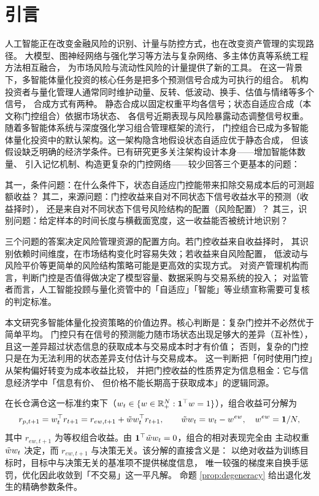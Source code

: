\section{引言}

人工智能正在改变金融风险的识别、计量与防控方式，也在改变资产管理的实现路径。
大模型、图神经网络与强化学习等方法与复杂网络、多主体仿真等系统工程方法相互融合，
为市场风险与流动性风险的计量提供了新的工具\cite{hong2021,suzhi2017,wangfang2020}。
在这一背景下，多智能体量化投资的核心任务是把多个预测信号合成为可执行的组合。
机构投资者与量化管理人通常同时维护动量、反转、低波动、换手、估值与情绪等多个信号，
合成方式有两种。
静态合成以固定权重平均各信号；状态自适应合成（本文称门控组合）依据市场状态、
各信号近期表现与风险暴露动态调整信号权重。
随着多智能体系统与深度强化学习组合管理框架的流行\cite{jiang2017,liu2020,li2024}，
门控组合已成为多智能体量化投资中的默认架构。这一架构隐含地假设状态自适应优于静态合成，
但该假设缺乏明确的经济学条件。已有研究更多关注架构设计本身——增加智能体数量、
引入记忆机制、构造更复杂的门控网络——较少回答三个更基本的问题：

其一，条件问题：在什么条件下，状态自适应门控能带来扣除交易成本后的可测超额收益？
其二，来源问题：门控收益来自对不同状态下信号收益水平的预测（收益择时），
还是来自对不同状态下信号风险结构的配置（风险配置）？
其三，识别问题：给定样本的时间长度与横截面宽度，这一收益能否被统计地识别？

三个问题的答案决定风险管理资源的配置方向。若门控收益来自收益择时，
其识别依赖时间维度，在市场结构变化时容易失效；若收益来自风险配置，
低波动与风险平价等更简单的风险结构策略可能是更高效的实现方式。
对资产管理机构而言，判断门控是否值得做决定了模型容量、数据采购与交易系统的投入；
对监管者而言，人工智能投顾与量化资管中的「自适应」「智能」等业绩宣称需要可复核的判定标准。

本文研究多智能体量化投资策略的价值边界。核心判断是：复杂门控并不必然优于简单平均。
门控只有在信号的预测能力随市场状态出现足够大的差异（互补性），
且这一差异超过状态信息的获取成本与交易成本时才有价值；
否则，复杂的门控只是在为无法利用的状态差异支付估计与交易成本。
这一判断把「何时使用门控」从架构偏好转变为成本收益比较，
并把门控收益的性质界定为信息租金：它与信息经济学中「信息有价、
但价格不能长期高于获取成本」的逻辑同源\cite{grossman1980}。

在长仓满仓这一标准约束下（$w_t\in\{w\in\mathbb{R}^N_+:\mathbf{1}^\top w=1\}$），组合收益可分解为
\begin{equation}
r_{p,t+1}=w_t^\top r_{t+1}=r_{ew,t+1}+\tilde{w} w_t^\top r_{t+1},
\qquad \tilde{w} w_t=w_t-w^{ew},\quad w^{ew}=\mathbf{1}/N,
\label{eq:intro-decomp}
\end{equation}
其中 $r_{ew,t+1}$ 为等权组合收益。由 $\mathbf{1}^\top\tilde{w} w_t=0$，组合的相对表现完全由
主动权重 $\tilde{w} w_t$ 决定，而 $r_{ew,t+1}$ 与决策无关。该分解的直接含义是：
以绝对收益为训练目标时，目标中与决策无关的基准项不提供梯度信息，
唯一较强的梯度来自换手惩罚，优化因此收敛到「不交易」这一平凡解。
命题 \ref{prop:degeneracy} 给出退化发生的精确参数条件。

